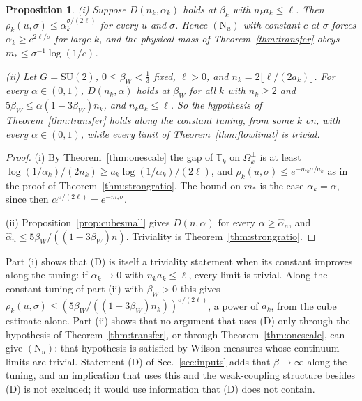 \documentclass[aps,prd,twocolumn,superscriptaddress,nofootinbib,longbibliography,floatfix,amsmath,amssymb,10pt]{revtex4-2}
\newtheorem{proposition}[theorem]{Proposition}
\theoremstyle{definition}
\theoremstyle{remark}
\newcommand{\SU}{\mathrm{SU}}
\begin{document}
\begin{proposition}\label{prop:cubecompatible}
\textup{(i)} Suppose $D(n_k,\alpha_k)$ holds at $\beta_k$ with $n_ka_k\le\ell$.
Then $\rho_k(u,\sigma)\le\alpha_k^{\sigma/(2\ell)}$ for every $u$ and
$\sigma$. Hence $(\mathrm N_u)$ with constant $c$ at $\sigma$ forces
$\alpha_k\ge c^{2\ell/\sigma}$ for large $k$, and the physical mass of
Theorem~\textup{\ref{thm:transfer}} obeys $m_*\le\sigma^{-1}\log(1/c)$.

\textup{(ii)} Let $G=\SU(2)$, $0\le\beta_W<\frac13$ fixed, $\ell>0$, and
$n_k=2\lfloor\ell/(2a_k)\rfloor$. For every $\alpha\in(0,1)$, $D(n_k,\alpha)$
holds at $\beta_W$ for all $k$ with $n_k\ge2$ and
$5\beta_W\le\alpha(1-3\beta_W)n_k$, and $n_ka_k\le\ell$. So the hypothesis of
Theorem~\textup{\ref{thm:transfer}} holds along the constant tuning, from
some $k$ on, with every $\alpha\in(0,1)$, while every limit of
Theorem~\textup{\ref{thm:flowlimit}} is trivial.
\end{proposition}

\begin{proof}
(i) By Theorem~\ref{thm:onescale} the gap of $\mathbb T_k$ on
$\Omega_k^\perp$ is at least $\log(1/\alpha_k)/(2n_k)\ge a_k\log(1/\alpha_k)
/(2\ell)$, and $\rho_k(u,\sigma)\le e^{-m_k\sigma/a_k}$ as in the proof of
Theorem~\ref{thm:strongratio}. The bound on $m_*$ is the case $\alpha_k=
\alpha$, since then $\alpha^{\sigma/(2\ell)}=e^{-m_*\sigma}$.

(ii) Proposition~\ref{prop:cubesmall} gives $D(n,\alpha)$ for every
$\alpha\ge\hat\alpha_n$, and $\hat\alpha_n\le5\beta_W/((1-3\beta_W)n)$.
Triviality is Theorem~\ref{thm:strongratio}.
\end{proof}

Part (i) shows that (D) is itself a triviality statement when its constant
improves along the tuning: if $\alpha_k\to0$ with $n_ka_k\le\ell$, every limit
is trivial. Along the constant tuning of part (ii) with $\beta_W>0$ this gives
$\rho_k(u,\sigma)\le(5\beta_W/((1-3\beta_W)n_k))^{\sigma/(2\ell)}$, a power of
$a_k$, from the cube estimate alone. Part (ii) shows that no argument that
uses (D) only through the hypothesis of Theorem~\ref{thm:transfer}, or through
Theorem~\ref{thm:onescale}, can give $(\mathrm N_u)$: that hypothesis is
satisfied by Wilson measures whose continuum limits are trivial. Statement
(D) of Sec.~\ref{sec:inputs} adds that $\beta\to\infty$ along the tuning, and an
implication that uses this and the weak-coupling structure besides (D) is not
excluded; it would use information that (D) does not contain.
\end{document}
